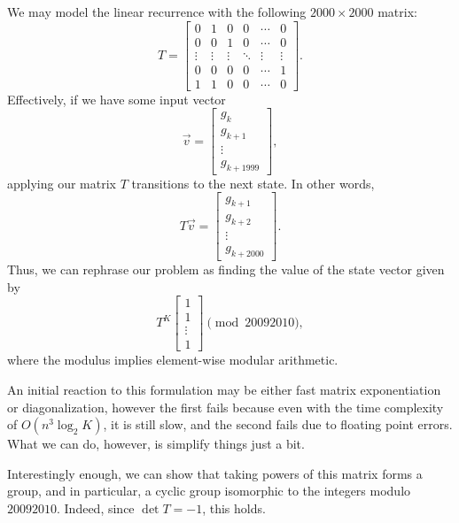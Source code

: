 \documentclass[a4paper, 12pt]{article}
\begin{document}
\begin{solution}
    We may model the linear recurrence with the following \( 2000 \times 2000 \) matrix:
    \[
        T = \begin{bmatrix}
            0 & 1 & 0 & 0 & \cdots & 0 \\
            0 & 0 & 1 & 0 & \cdots & 0 \\
            \vdots & \vdots & \vdots & \ddots & \vdots & \vdots \\
            0 & 0 & 0 & 0 & \cdots & 1 \\
            1 & 1 & 0 & 0 & \cdots & 0
        \end{bmatrix}
    .\]
    Effectively, if we have some input vector
    \[
        \vec{v} = \begin{bmatrix}
            g_k \\
            g_{k + 1} \\
            \vdots \\
            g_{k + 1999}
        \end{bmatrix}
    ,\]
    applying our matrix \( T \) transitions to the next state. In other words,
    \[
        T \vec{v} = \begin{bmatrix}
            g_{k + 1} \\
            g_{k + 2} \\
            \vdots \\
            g_{k + 2000}
        \end{bmatrix}
    .\]
    Thus, we can rephrase our problem as finding the value of the state vector given by
    \[
        T^{K} \begin{bmatrix}
            1 \\
            1 \\
            \vdots \\
            1
        \end{bmatrix} \pmod{20092010}
    ,\]
    where the modulus implies element-wise modular arithmetic.

    An initial reaction to this formulation may be either fast matrix exponentiation or diagonalization, however the first fails because even with the time complexity of \( O(n^3 \log_2{K}) \), it is still slow, and the second fails due to floating point errors. What we can do, however, is simplify things just a bit.

    Interestingly enough, we can show that taking powers of this matrix forms a group, and in particular, a cyclic group isomorphic to the integers modulo \( 20092010 \). Indeed, since \( \det T = -1 \), this holds.


\end{solution}
\end{document}
